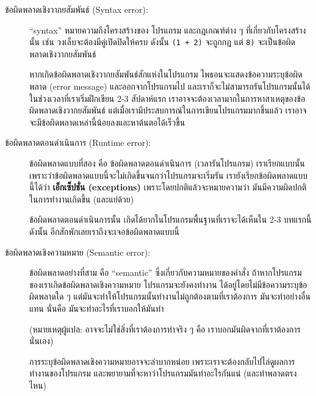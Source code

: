 \begin{description}

\item[ข้อผิดพลาดเชิงวากยสัมพันธ์ (Syntax error):] ``syntax'' หมายความถึงโครงสร้างของ
โปรแกรม และกฎเกณฑ์ต่าง ๆ ที่เกี่ยวกับโครงสร้างนั้น เช่น วงเล็บจะต้องมีคู่เปิดปิดให้ครบ ดังนั้น 
{\tt (1 + 2)}  จะถูกกฎ แต่ {\tt 8)} จะเป็นข้อผิดพลาดเชิงวากยสัมพันธ์ 
  
   
  
   

 หากเกิดข้อผิดพลาดเชิงวากยสัมพันธ์สักแห่งในโปรแกรม ไพธอนจะแสดงข้อความระบุข้อผิดพลาด (error 
 message) และออกจากโปรแกรมไป และเราก็จะไม่สามารถรันโปรแกรมนั้นได้ ในช่วงเวลาที่เราเริ่มฝึกเขียน 
 2-3 สัปดาห์แรก เราอาจจะต้องเวลามากในการหาสาเหตุของข้อผิดพลาดเชิงวากยสัมพันธ์ 
 แต่เมื่อเรามีประสบการณ์ในการเขียนโปรแกรมมากขึ้นแล้ว เราอาจจะมีข้อผิดพลาดเหล่านี้น้อยลงและหาต้นตอได้เร็วขึ้น


\item[ข้อผิดพลาดตอนดำเนินการ (Runtime error):] ข้อผิดพลาดแบบที่สอง คือ ข้อผิดพลาดตอนดำเนินการ (เวลารันโปรแกรม)  เราเรียกแบบนั้น เพราะว่าข้อผิดพลาดแบบนี้จะไม่เกิดขึ้นจนกว่าโปรแกรมจะเริ่มรัน  เรายังเรียกข้อผิดพลาดแบบนี้ได้ว่า {\bf เอ็กเซ็ปชั่น (exceptions)} เพราะโดยปกติแล้วจะหมายความว่า มันมีความผิดปกติในการทำงานเกิดขึ้น (และแย่ด้วย)
  
   
  
   

 ข้อผิดพลาดตอนดำเนินการนั้น เกิดได้ยากในโปรแกรมพื้นฐานที่เราจะได้เห็นใน 2-3 บทแรกนี้ 
 ดังนั้น อีกสักพักเลยเราถึงจะเจอข้อผิดพลาดแบบนี้


\item[ข้อผิดพลาดเชิงความหมาย (Semantic error):] ข้อผิดพลาดอย่างที่สาม คือ ``semantic'' 
ซึ่งเกี่ยวกับความหมายของคำสั่ง ถ้าหากโปรแกรมของเราเกิดข้อผิดพลาดเชิงความหมาย โปรแกรมจะยังคงทำงาน
ได้อยู่โดยไม่มีข้อความระบุข้อผิดพลาดใด ๆ  แต่มันจะทำให้โปรแกรมนั้นทำงานไม่ถูกต้องตามที่เราต้องการ 
มันจะทำอย่างอื่นแทน นั่นคือ มันจะทำอะไรที่เราบอกให้มันทำ 

(หมายเหตุผู้แปล: อาจจะไม่ใช่สิ่งที่เราต้องการทำจริง ๆ คือ เราบอกมันผิดจากที่เราต้องการนั่นเอง)
   
   

การระบุข้อผิดพลาดเชิงความหมายอาจจะลำบากหน่อย เพราะเราจะต้องกลับไปไล่ดูผลการทำงานของโปรแกรม
และพยายามที่จะหาว่าโปรแกรมมันทำอะไรกันแน่ (และทำพลาดตรงไหน)

\end{description}


